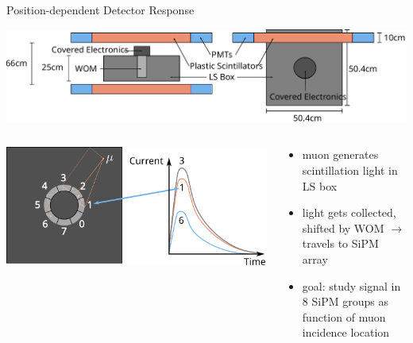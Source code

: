 \documentclass[aspectratio=169]{beamer}
\begin{document}
	\begin{frame}{Position-dependent Detector Response}
		\centering
		
		\includegraphics[width=.8\textwidth]{pictures/cosmics.pdf}
		
		\begin{columns}
			\begin{column}{.5\textwidth}
				\centering
				\includegraphics[width=1\textwidth]{pictures/detector-response.pdf}	
			\end{column}
		
			\begin{column}{.5\textwidth}
				\begin{itemize}
					\item muon generates scintillation light in LS box
					\item light gets collected, shifted by WOM $\rightarrow$ travels to SiPM array
					\item goal: study signal in 8 SiPM groups as function of muon incidence location
				\end{itemize}
			\end{column}
		
		\end{columns}
	
	\end{frame}

	
	
	
\end{document}
